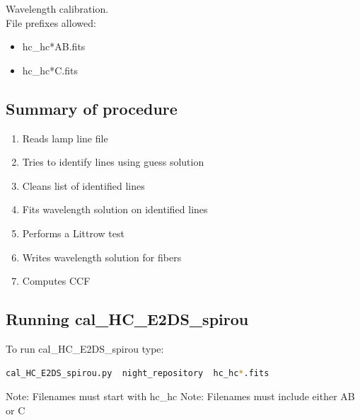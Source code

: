 Wavelength calibration. \\


\noindent File prefixes allowed:
\begin{itemize}
	\item hc\_hc*AB.fits
	\item hc\_hc*C.fits
\end{itemize}

\subsection{Summary of procedure}
\begin{enumerate}
	\item Reads lamp line file
	\item Tries to identify lines using guess solution
	\item Cleans list of identified lines
	\item Fits wavelength solution on identified lines
	\item Performs a Littrow test
	\item Writes wavelength solution for fibers
	\item Computes CCF
\end{enumerate}

\subsection{Running cal\_HC\_E2DS\_spirou}

To run cal\_HC\_E2DS\_spirou type:
\begin{lstlisting}[language=bash, style=bashstyle]
cal_HC_E2DS_spirou.py  night_repository  hc_hc*.fits
\end{lstlisting}

\noindent Note: Filenames must start with hc\_hc
\noindent Note: Filenames must include either AB or C




